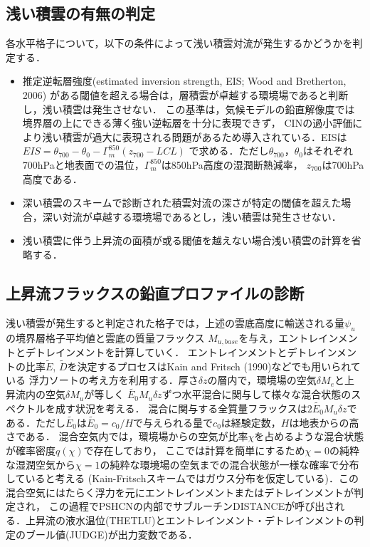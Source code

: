 \documentclass[platex, dvipdfmx]{jsarticle}
\begin{document}
\subsection{浅い積雲の有無の判定}
 各水平格子について，以下の条件によって浅い積雲対流が発生するかどうかを判定する．
 \begin{itemize}
    \item 推定逆転層強度(estimated inversion strength, EIS; Wood and Bretherton, 2006) がある閾値を超える場合は，層積雲が卓越する環境場であると判断し，浅い積雲は発生させない．
     この基準は，気候モデルの鉛直解像度では境界層の上にできる薄く強い逆転層を十分に表現できず，
     CINの過小評価により浅い積雲が過大に表現される問題があるため導入されている．EISは
     $EIS=\theta_{700}-\theta_{0}-\Gamma_m^{850}(z_{700}-LCL)$
    で求める．ただし$\theta_{700}$，$\theta_0$はそれぞれ700hPaと地表面での温位，$\Gamma_m^{850}$は850hPa高度の湿潤断熱減率，
    $z_{700}$は700hPa高度である．
   \item 深い積雲のスキームで診断された積雲対流の深さが特定の閾値を超えた場合，深い対流が卓越する環境場であるとし，浅い積雲は発生させない．
   \item 浅い積雲に伴う上昇流の面積が或る閾値を越えない場合浅い積雲の計算を省略する． 
 \end{itemize}

\subsection{上昇流フラックスの鉛直プロファイルの診断}
浅い積雲が発生すると判定された格子では，上述の雲底高度に輸送される量$\psi_u$の境界層格子平均値と雲底の質量フラックス
$M_{u,base}$を与え，エントレインメントとデトレインメントを計算していく．
エントレインメントとデトレインメントの比率$\tilde{E}$, $\tilde{D}$を決定するプロセスはKain and Fritsch (1990)などでも用いられている
浮力ソートの考え方を利用する．厚さ$\delta z$の層内で，環境場の空気$\delta M_e$と上昇流内の空気$\delta M_u$が等しく
$\tilde{E_0} M_u \delta z$ずつ水平混合に関与して様々な混合状態のスペクトルを成す状況を考える．
混合に関与する全質量フラックスは$2\tilde{E_0} M_u\delta z$である．ただし$\tilde{E_0}$は$\tilde{E_0}=c_0/H$で与えられる量で$c_0$は経験定数，$H$は地表からの高さである．
混合空気内では，環境場からの空気が比率$\chi$を占めるような混合状態が確率密度$q(\chi)$で存在しており，
ここでは計算を簡単にするため$\chi=0$の純粋な湿潤空気から$\chi=1$の純粋な環境場の空気までの混合状態が一様な確率で分布していると考える
(Kain-Fritschスキームではガウス分布を仮定している)．この混合空気にはたらく浮力を元にエントレインメントまたはデトレインメントが判定され，
この過程でPSHCNの内部でサブルーチンDISTANCEが呼び出される．上昇流の液水温位(THETLU)とエントレインメント・デトレインメントの判定のブール値(JUDGE)が出力変数である．
\end{document}
